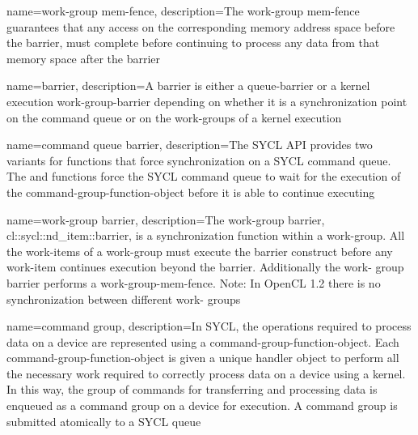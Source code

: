 {
  name={work-group mem-fence},
  description={The work-group mem-fence guarantees that any access on the
               corresponding memory address space before the barrier, must
               complete before continuing to process any data from that memory
               space after the barrier}
}

{
  name=barrier,
  description={A barrier is either a \gls{queue-barrier} or a
               kernel execution \gls{work-group-barrier} depending on whether it is
               a synchronization point on the command queue or on
               the work-groups of a kernel execution}
}

{
  name={command queue barrier},
  description={The SYCL API provides two variants for functions that force
               synchronization on a SYCL command queue. The
                and
               functions force the SYCL command queue to wait for the
               execution of the \gls{command-group-function-object} before it is able to
               continue executing}
}

{
  name={work-group barrier},
  description={The work-group barrier, cl::sycl::nd_item::barrier, is a 
               synchronization function within a \gls{work-group}. All the
               \glspl{work-item} of a work-group must execute the barrier construct before any \gls{work-item}
               continues execution beyond the barrier. Additionally the work-
               group barrier performs a \gls{work-group-mem-fence}. Note: In
               OpenCL 1.2 there is no synchronization between different work-
               groups}
}

{
  name={command group},
  description={In SYCL, the operations required to process data on a
    \gls{device} are represented using a \gls{command-group-function-object}.
    Each \gls{command-group-function-object} is given a unique \gls{handler} object
    to perform all the necessary work required to correctly process data
    on a \gls{device} using a kernel. In this way, the group of commands for
               transferring and processing data is enqueued as a command
               group on a \gls{device} for execution. A command group is submitted
               atomically to a SYCL queue}
}


